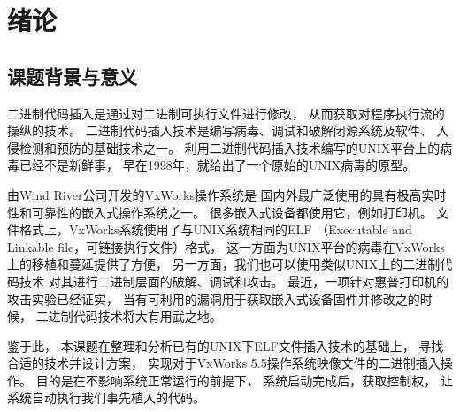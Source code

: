 \chapter{绪论}

%
%
%

\section{课题背景与意义}

二进制代码插入是通过对二进制可执行文件进行修改，
从而获取对程序执行流的操纵的技术。
二进制代码插入技术是编写病毒、调试和破解闭源系统及软件、
入侵检测和预防的基础技术之一。
利用二进制代码插入技术编写的UNIX平台上的病毒已经不是新鲜事，
早在1998年，\cite{silvio}就给出了一个原始的UNIX病毒的原型。

由Wind River公司开发的VxWorks操作系统是
国内外最广泛使用的具有极高实时性和可靠性的嵌入式操作系统之一。
很多嵌入式设备都使用它，例如打印机。
文件格式上，VxWorks系统使用了与UNIX系统相同的ELF
（Executable and Linkable file，可链接执行文件）格式，
这一方面为UNIX平台的病毒在VxWorks上的移植和蔓延提供了方便，
另一方面，我们也可以使用类似UNIX上的二进制代码技术
对其进行二进制层面的破解、调试和攻击。
最近，一项针对惠普打印机的攻击实验已经证实，
当有可利用的漏洞用于获取嵌入式设备固件并修改之的时候，
二进制代码技术将大有用武之地。


鉴于此，
本课题在整理和分析已有的UNIX下ELF文件插入技术的基础上，
寻找合适的技术并设计方案，
实现对于VxWorks 5.5操作系统映像文件的二进制插入操作。
目的是在不影响系统正常运行的前提下，
系统启动完成后，获取控制权，
让系统自动执行我们事先植入的代码。

